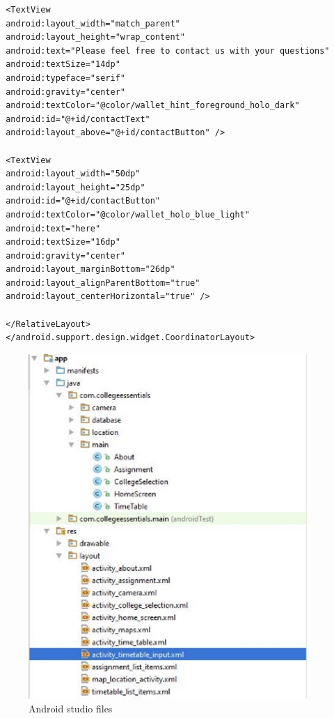 \begin{verbatim}
 <TextView
 android:layout_width="match_parent"
 android:layout_height="wrap_content"
 android:text="Please feel free to contact us with your questions"
 android:textSize="14dp"
 android:typeface="serif"
 android:gravity="center"
 android:textColor="@color/wallet_hint_foreground_holo_dark"
 android:id="@+id/contactText"
 android:layout_above="@+id/contactButton" />
 
 <TextView
 android:layout_width="50dp"
 android:layout_height="25dp"
 android:id="@+id/contactButton"
 android:textColor="@color/wallet_holo_blue_light"
 android:text="here"
 android:textSize="16dp"
 android:gravity="center"
 android:layout_marginBottom="26dp"
 android:layout_alignParentBottom="true"
 android:layout_centerHorizontal="true" />
 
 </RelativeLayout>
 </android.support.design.widget.CoordinatorLayout>
 \end{verbatim}
 
 \begin{figure}[h]
 	\centering
 	\includegraphics{img/screenshot.jpg}
 	 	\caption{Android studio files}
 \end{figure}
 
\pagebreak
